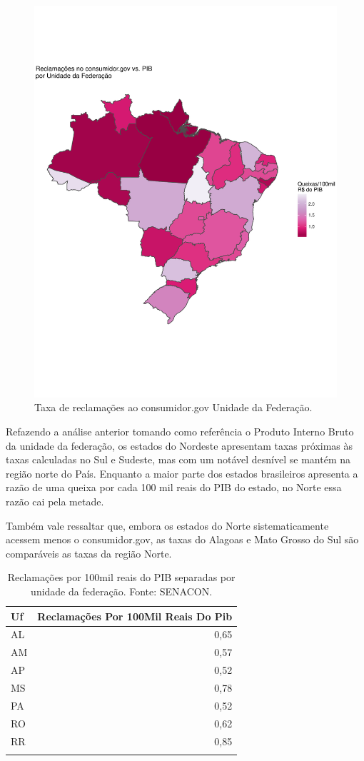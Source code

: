 \documentclass[]{report}
\begin{document}
\begin{figure}[htbp]
\centering
\includegraphics{imgs/senacon_pib.pdf}
\caption{Taxa de reclamações ao consumidor.gov Unidade da
Federação.}\label{senacon_pib}
\end{figure}

Refazendo a análise anterior tomando como referência o Produto Interno
Bruto da unidade da federação, os estados do Nordeste apresentam taxas
próximas às taxas calculadas no Sul e Sudeste, mas com um notável
desnível se mantém na região norte do País. Enquanto a maior parte dos
estados brasileiros apresenta a razão de uma queixa por cada 100 mil
reais do PIB do estado, no Norte essa razão cai pela metade.

Também vale ressaltar que, embora os estados do Norte sistematicamente
acessem menos o consumidor.gov, as taxas do Alagoas e Mato Grosso do Sul
são comparáveis as taxas da região Norte.

\begin{longtable}{lr}
\caption{Reclamações por 100mil reais do PIB separadas por unidade da federação. Fonte: SENACON.} \\
  \hline
Uf & Reclamações Por 100Mil Reais Do Pib \\
  \hline
AL & 0,65 \\
  AM & 0,57 \\
  AP & 0,52 \\
  MS & 0,78 \\
  PA & 0,52 \\
  RO & 0,62 \\
  RR & 0,85 \\
   \hline
\hline
\label{unnamed-chunk-91}
\end{longtable}
\end{document}

